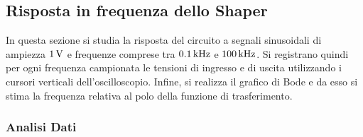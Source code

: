 \subsection{Risposta in frequenza dello Shaper}\label{sec:shaper_bode}
In questa sezione si studia la risposta del circuito a segnali sinusoidali di ampiezza
$1\,\si{\volt}$ e frequenze comprese tra $0.1\kHz$ e $100\kHz$. Si registrano quindi per ogni
frequenza campionata le tensioni di ingresso e di uscita utilizzando i cursori verticali
dell'oscilloscopio. Infine, si realizza il grafico di Bode e da esso si stima la frequenza relativa al polo della funzione di trasferimento.

\subsubsection{Analisi Dati}\label{sec:shaper_bode_analisi}

